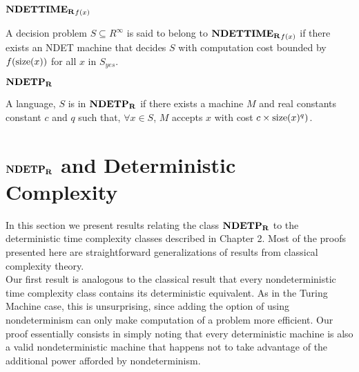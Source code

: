 \begin{definition}{$\mathbf{NDETTIME_R}_{f(x)}$}

  A decision problem $S \subseteq R^\infty$ is said to belong to
  $\mathbf{NDETTIME_R}_{f(x)}$ if there exists an NDET machine that decides $S$
  with computation cost bounded by $f(\text{size}(x))$ for all $x$ in
  $S_{yes}$.
  
\end{definition}

\begin{definition} $\mathbf{NDETP_R}$
  
  A language, $S$ is in $\mathbf{NDETP_R}$ if there exists a machine $M$ and
  real constants constant $c$ and $q$ such that, $\forall x \in S$,
  $M$ accepts $x$ with cost $c \times \text{size}(x)^q)$.
  
\end{definition}

\section{$\mathbf{NDETP_R}$ and Deterministic Complexity}

In this section we present results relating the class $\mathbf{NDETP_R}$ to the
deterministic time complexity classes described in Chapter 2.  Most of
the proofs presented here are straightforward generalizations
of results from classical complexity theory.\\

Our first result is analogous to the classical result that every
nondeterministic time complexity class contains its deterministic
equivalent.  As in the Turing Machine case, this is unsurprising,
since adding the option of using nondeterminism can only make
computation of a problem more efficient.  Our proof essentially
consists in simply noting that every deterministic machine is also a
valid nondeterministic machine that happens not to take advantage of
the additional power afforded by nondeterminism.


